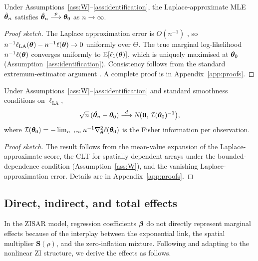 \begin{proposition}[Consistency]\label{prop:consistency}
Under Assumptions~\ref{ass:W}--\ref{ass:identification}, the Laplace-approximate MLE $\hat{\boldsymbol{\theta}}_n$ satisfies $\hat{\boldsymbol{\theta}}_n \overset{p}{\longrightarrow} \boldsymbol{\theta}_0$ as $n \to \infty$.
\end{proposition}

\begin{proof}[Proof sketch]
The Laplace approximation error is $O(n^{-1})$ \citep{tierney_kadane1986}, so $n^{-1}\ell_{\mathrm{LA}}(\boldsymbol{\theta}) - n^{-1}\ell(\boldsymbol{\theta}) \to 0$ uniformly over $\Theta$.
The true marginal log-likelihood $n^{-1}\ell(\boldsymbol{\theta})$ converges uniformly to $\mathbb{E}[\ell_1(\boldsymbol{\theta})]$, which is uniquely maximised at $\boldsymbol{\theta}_0$ (Assumption~\ref{ass:identification}).
Consistency follows from the standard extremum-estimator argument \citep{newey_mcfadden1994}.
A complete proof is in Appendix~\ref{app:proofs}.
\end{proof}

\begin{proposition}\label{prop:normality}
Under Assumptions~\ref{ass:W}--\ref{ass:identification} and standard smoothness conditions on $\ell_{\mathrm{LA}}$,
\[
  \sqrt{n}\,(\hat{\boldsymbol{\theta}}_n - \boldsymbol{\theta}_0) \overset{d}{\longrightarrow} N\!\bigl(\mathbf{0},\,\mathcal{I}(\boldsymbol{\theta}_0)^{-1}\bigr),
\]
where $\mathcal{I}(\boldsymbol{\theta}_0) = -\lim_{n\to\infty} n^{-1}\nabla^2_{\boldsymbol{\theta}}\ell(\boldsymbol{\theta}_0)$ is the Fisher information per observation.
\end{proposition}

\begin{proof}[Proof sketch]
The result follows from the mean-value expansion of the Laplace-approximate score, the CLT for spatially dependent arrays under the bounded-dependence condition (Assumption~\ref{ass:W}), and the vanishing Laplace-approximation error.
Details are in Appendix~\ref{app:proofs}.
\end{proof}

\subsection{Direct, indirect, and total effects}\label{sec:est_effects}

In the ZISAR model, regression coefficients $\boldsymbol{\beta}$ do not directly represent marginal effects because of the interplay between the exponential link, the spatial multiplier $\mathbf{S}(\rho)$, and the zero-inflation mixture.
Following \citet{lesage_pace2009} and adapting to the nonlinear ZI structure, we derive the effects as follows.

